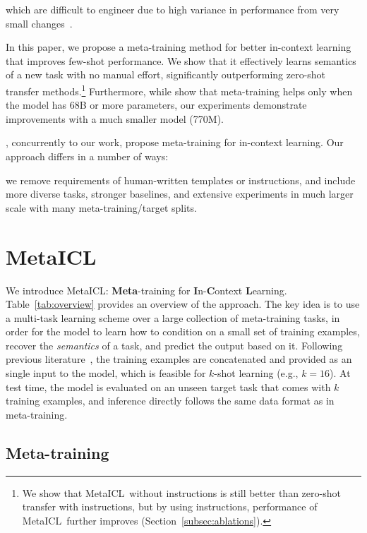 which are difficult to engineer due to high variance in performance from very small changes~\citep{mishra2021reframing}.

In this paper, we propose a meta-training method for better in-context learning that improves few-shot performance. We show that it effectively learns semantics of a new task with no manual effort, significantly outperforming zero-shot transfer methods.\footnote{We show that MetaICL\ without instructions is still better than zero-shot transfer with instructions, but by using instructions, performance of MetaICL\ further improves (Section~\ref{subsec:ablations}).}
Furthermore, while \citet{wei2022finetuned} show that meta-training helps only when the model has 68B or more parameters, our experiments demonstrate improvements with a much smaller model (770M).

\citet{chen2022meta}, concurrently to our work, propose meta-training for in-context learning. Our approach differs in a number of ways:

we remove requirements of human-written templates or instructions, and include more diverse tasks, stronger baselines, and extensive experiments in much larger scale with many meta-training/target splits.

\section{MetaICL}\label{sec:method}

We introduce MetaICL: \textbf{Meta}-training for \textbf{I}n-\textbf{C}ontext \textbf{L}earning.
Table~\ref{tab:overview} provides an overview of the approach. The key idea is to use a multi-task learning scheme over a large collection of meta-training tasks, in order for the model to learn how to condition on a small set of training examples, recover the {\em semantics} of a task, and predict the output based on it. Following previous literature~\citep{brown2020language}, the training examples are concatenated and provided as an single input to the model, which is feasible for $k$-shot learning (e.g., $k=16$). At test time, the model is evaluated on an unseen target task that comes with $k$ training examples, and inference directly follows the same data format as in meta-training.

\subsection{Meta-training}\label{subsec:meta-training}

